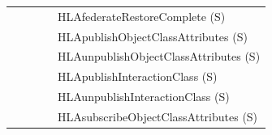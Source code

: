 \begin{compactstdpage}
\begin{momtabletypeset}[8.00]
{{\begin{tabular}{|Y{76.87pt}|Y{60.44pt}|Y{67.64pt}|Y{54.56pt}|Y{156.97pt}|}
                    &                &                 &                        & HLAfederateRestoreComplete (S)                        \\
                    &                &                 &                        & HLApublishObjectClassAttributes (S)                   \\
                    &                &                 &                        & HLAunpublishObjectClassAttributes (S)                 \\
                    &                &                 &                        & HLApublishInteractionClass (S)                        \\
                    &                &                 &                        & HLAunpublishInteractionClass (S)                      \\
                    &                &                 &                        & HLAsubscribeObjectClassAttributes (S)                 \\
                    \hline
                \end{tabular}%
            }%
        }%
    \end{momtabletypeset}
\end{compactstdpage}
\clearpage

